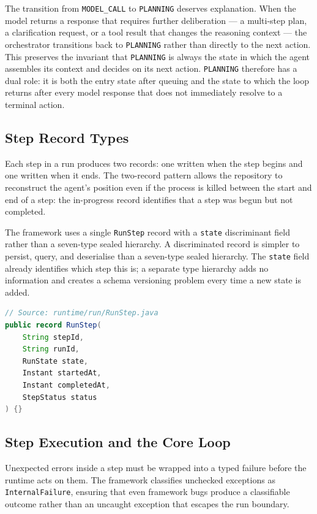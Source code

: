 The transition from \texttt{MODEL\_CALL} to \texttt{PLANNING} deserves explanation.
When the model returns a response that requires further deliberation — a
multi-step plan, a clarification request, or a tool result that changes the
reasoning context — the orchestrator transitions back to \texttt{PLANNING}
rather than directly to the next action.
This preserves the invariant that \texttt{PLANNING} is always the state in which
the agent assembles its context and decides on its next action.
\texttt{PLANNING} therefore has a dual role: it is both the entry state after
queuing and the state to which the loop returns after every model response that
does not immediately resolve to a terminal action.

\subsection{Step Record Types}
\label{subsec:step-records}

Each step in a run produces two records: one written when the step begins and one
written when it ends.
The two-record pattern allows the repository to reconstruct the agent's position
even if the process is killed between the start and end of a step: the in-progress
record identifies that a step was begun but not completed.

The framework uses a single \texttt{RunStep} record with a \texttt{state}
discriminant field rather than a seven-type sealed hierarchy.
A discriminated record is simpler to persist, query, and deserialise than a
seven-type sealed hierarchy.
The \texttt{state} field already identifies which step this is; a separate type
hierarchy adds no information and creates a schema versioning problem every time
a new state is added.

\begin{lstlisting}[language=Java,caption={Unified step record --- \texttt{runtime/run/RunStep.java}},label={lst:run-step}]
// Source: runtime/run/RunStep.java
public record RunStep(
    String stepId,
    String runId,
    RunState state,
    Instant startedAt,
    Instant completedAt,
    StepStatus status
) {}
\end{lstlisting}

\subsection{Step Execution and the Core Loop}
\label{subsec:core-loop}

Unexpected errors inside a step must be wrapped into a typed failure before the
runtime acts on them.
The framework classifies unchecked exceptions as \texttt{InternalFailure}, ensuring
that even framework bugs produce a classifiable outcome rather than an uncaught
exception that escapes the run boundary.


